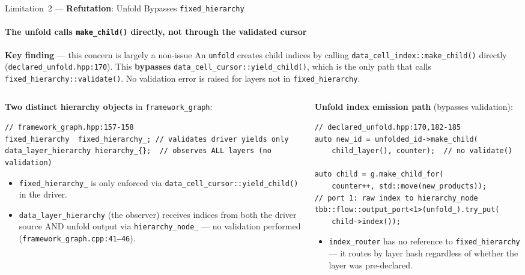 \documentclass[aspectratio=169,10pt]{beamer}
\newcommand{\bad}[1]{\textcolor{red!70!black}{\textbf{#1}}}
\newcommand{\corr}[1]{\colorbox{yellow!30}{\textbf{#1}}}
\newcommand{\code}[1]{\texttt{\small #1}}
\begin{document}
\begin{frame}[fragile]{Limitation~2 --- \corr{Refutation}: Unfold Bypasses \texttt{fixed\_hierarchy}}
  \framesubtitle{The unfold calls \texttt{make\_child()} directly, not through the validated cursor}

  \begin{alertblock}{\corr{Key finding} --- this concern is largely a non-issue}
    An \code{unfold} creates child indices by calling
    \code{data\_cell\_index::make\_child()} directly
    (\texttt{declared\_unfold.hpp:170}).
    This \bad{bypasses} \code{data\_cell\_cursor::yield\_child()}, which is
    the only path that calls \code{fixed\_hierarchy::validate()}.
    No validation error is raised for layers not in \code{fixed\_hierarchy}.
  \end{alertblock}

  \begin{columns}[T]
    \begin{column}{0.50\textwidth}
      \textbf{Two distinct hierarchy objects} in \code{framework\_graph}:
      \begin{lstlisting}
// framework_graph.hpp:157-158
fixed_hierarchy  fixed_hierarchy_; // validates driver yields only
data_layer_hierarchy hierarchy_{};  // observes ALL layers (no validation)
      \end{lstlisting}
      \begin{itemize}\small
        \item \code{fixed\_hierarchy\_} is only enforced via
              \code{data\_cell\_cursor::yield\_child()} in the driver.
        \item \code{data\_layer\_hierarchy} (the observer) receives indices
              from both the driver source AND unfold output via
              \code{hierarchy\_node\_} --- no validation performed
              (\texttt{framework\_graph.cpp:41--46}).
      \end{itemize}
    \end{column}
    \begin{column}{0.46\textwidth}
      \textbf{Unfold index emission path} (bypasses validation):
      \begin{lstlisting}
// declared_unfold.hpp:170,182-185
auto new_id = unfolded_id->make_child(
    child_layer(), counter);  // no validate()

auto child = g.make_child_for(
    counter++, std::move(new_products));
// port 1: raw index to hierarchy_node
tbb::flow::output_port<1>(unfold_).try_put(
    child->index());
      \end{lstlisting}
      \begin{itemize}\small
        \item \code{index\_router} has no reference to
              \code{fixed\_hierarchy} --- it routes by layer hash
              regardless of whether the layer was pre-declared.
      \end{itemize}
    \end{column}
  \end{columns}
\end{frame}
\end{document}
